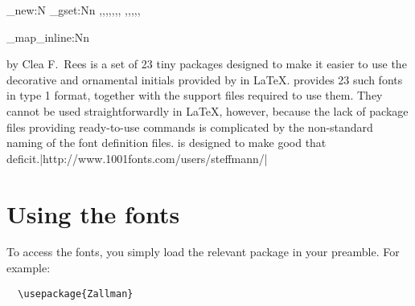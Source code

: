 \ExplSyntaxOn
\clist_new:N\dropcapslist
\clist_gset:Nn \dropcapslist
    {\Royal,\Romantik,\EileenBlfamily,\Zallmanfamily,\Konanurfamily,\Starburstfamily,\Typocapsfamily, \ArtNouvcfamily,\Kramerfamily,\GotInfamily,\Sanremofamily,\ArtNouvfamily,}
\ExplSyntaxOff

\setcounter{DefaultLines}{3}%

\makeatletter

\long{}
	

 
\ExplSyntaxOn
 \clist_map_inline:Nn
\ExplSyntaxOff
	
\makeatother


\begin{latexquote}
  \hspace*{-\parindent} by Clea F.\ Rees is a set of 23 tiny packages designed to make it easier to use the decorative and ornamental initials provided by  in \LaTeX.
   provides 23 such fonts in type 1 format, together with the support files required to use them.
  They cannot be used straightforwardly in \LaTeX, however, because the lack of package files providing ready-to-use commands is complicated by the non-standard naming of the font definition files.
   is designed to make good that deficit.|http://www.1001fonts.com/users/steffmann/|
\end{latexquote}

\section{Using the fonts}\label{sec:usage}

To access the fonts, you simply load the relevant package in your preamble.
For example:
\begin{verbatim}
  \usepackage{Zallman}
\end{verbatim}

